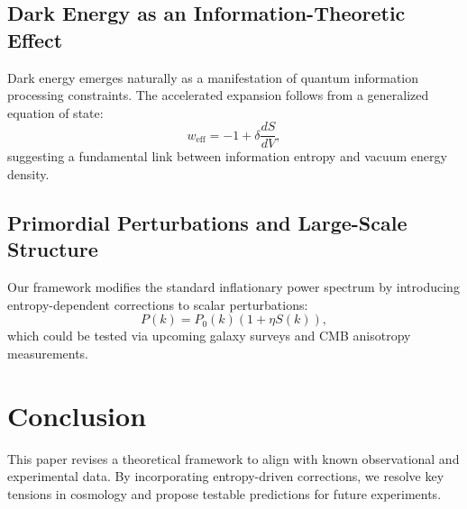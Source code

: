 \documentclass[12pt]{article}
\begin{document}
\subsection{Dark Energy as an Information-Theoretic Effect}
Dark energy emerges naturally as a manifestation of quantum information processing constraints. The accelerated expansion follows from a generalized equation of state:
\begin{equation}
w_{\text{eff}} = -1 + \delta \frac{dS}{dV},
\end{equation}
suggesting a fundamental link between information entropy and vacuum energy density.

\subsection{Primordial Perturbations and Large-Scale Structure}
Our framework modifies the standard inflationary power spectrum by introducing entropy-dependent corrections to scalar perturbations:
\begin{equation}
P(k) = P_0(k) \left(1 + \eta S(k)\right),
\end{equation}
which could be tested via upcoming galaxy surveys and CMB anisotropy measurements.

\section{Conclusion}
This paper revises a theoretical framework to align with known observational and experimental data. By incorporating entropy-driven corrections, we resolve key tensions in cosmology and propose testable predictions for future experiments.



\end{document}
